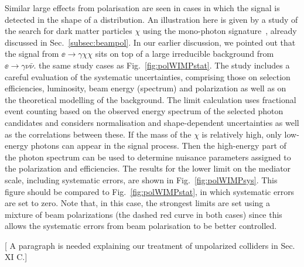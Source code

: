 Similar large effects from polarisation are seen in cases in which the signal is detected in 
the shape of  a  distribution.    An illustration here is given by a study of the search for 
dark matter particles $\chi$ using the mono-photon signature~\cite{Habermehl:417605}, already discussed in Sec.~\ref{subsec:beampol}.   In our earlier discussion, we pointed out that the signal from 
$\ee\to \gamma \chi\chi$ sits on top of a large irreducible background from 
$\ee\to \gamma \nu\bar \nu $.   the same study cases as Fig.~\ref{fig:polWIMPstat}. The study includes a careful evaluation of the systematic uncertainties, comprising those on selection efficiencies, luminosity, beam energy (spectrum) and polarization as well as on the theoretical modelling of the background. 
The limit calculation uses fractional event counting based on the observed energy spectrum of the selected photon candidates and considers normalisation and shape-dependent uncertainties as well as the correlations between these. If the mass of the $\chi$ is relatively high, only low-energy photons can appear in the signal process.  Then the high-energy part of the photon spectrum can be used to determine nuisance parameters assigned to the 
polarization and efficiencies.  The results for the lower limit on the mediator scale, including 
systematic errors, are shown in Fig.~\ref{fig:polWIMPsys}. This figure should be compared to 
Fig.~\ref{fig:polWIMPstat}, in which systematic errors are set to zero.   Note that, in this case, the strongest limits are set using a mixture of beam polarizations (the dashed red curve in both cases) since this allows the systematic errors from beam polarisation to be better 
controlled.



[ A paragraph is needed explaining our treatment of unpolarized colliders in Sec. XI C.]








